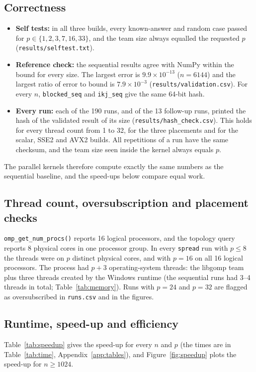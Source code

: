 \documentclass[11pt,a4paper]{article}
\begin{document}
\subsection{Correctness}\label{sec:correct}
\begin{itemize}[leftmargin=1.4em]
  \item \textbf{Self tests:} in all three builds, every known-answer and random case passed for
        $p\in\{1,2,3,7,16,33\}$, and the team size always equalled the requested $p$
        (\texttt{results/selftest.txt}).
  \item \textbf{Reference check:} the sequential results agree with NumPy within the bound for
        every size. The largest error is $9.9\times10^{-13}$ ($n=6144$) and the largest ratio of
        error to bound is $7.9\times10^{-3}$ (\texttt{results/validation.csv}). For every $n$,
        \texttt{blocked\_seq} and \texttt{ikj\_seq} give the same 64-bit hash.
  \item \textbf{Every run:} each of the 190 runs, and of the 13 follow-up runs, printed the hash of the validated result of
        its size (\texttt{results/hash\_check.csv}). This holds for every thread count from 1 to 32, for
        the three placements and for the scalar, SSE2 and AVX2 builds. All repetitions of a run
        have the same checksum, and the team size seen inside the kernel always equals $p$.
\end{itemize}
The parallel kernels therefore compute exactly the same numbers as the sequential baseline,
and the speed-ups below compare equal work.

\subsection{Thread count, oversubscription and placement checks}
\texttt{omp\_get\_num\_procs()} reports 16 logical processors, and the topology query reports
8 physical cores in one processor group. In every \texttt{spread} run with $p\le8$ the threads
were on $p$ distinct physical cores, and with $p=16$ on all 16 logical processors. The process
had $p+3$ operating-system threads: the libgomp team plus three threads created by the
Windows runtime (the sequential runs had 3--4 threads in total; Table~\ref{tab:memory}). Runs with $p=24$ and
$p=32$ are flagged as oversubscribed in \texttt{runs.csv} and in the figures.

\subsection{Runtime, speed-up and efficiency}
Table~\ref{tab:speedup} gives the speed-up for every $n$ and $p$ (the times are in Table~\ref{tab:time}, Appendix~\ref{app:tables}), and Figure~\ref{fig:speedup}
plots the speed-up for $n\ge1024$.
\end{document}
